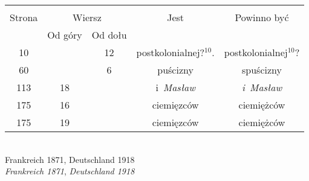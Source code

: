 \documentclass[a4paper,11pt]{article}
\begin{document}
\begin{center}

  \begin{tabular}{|c|c|c|c|c|}
    \hline
    & \multicolumn{2}{c|}{} & & \\
    Strona & \multicolumn{2}{c|}{Wiersz} & Jest
                              & Powinno być \\ \cline{2-3}
    & Od góry & Od dołu & & \\
    \hline
    10  & & 12 & postkolonialnej?$^{ 10 }$. & postkolonialnej$^{ 10 }$? \\
    60  & &  6 & puścizny & spuścizny \\
    113 & 18 & & i~\textit{Masław} & \textit{i~Masław} \\
    175 & 16 & & ciemięzców & ciemiężców \\
    175 & 19 & & ciemięzców & ciemiężców \\
    \hline
  \end{tabular}

\end{center}

\vspace{\spaceTwo}


\noindent
{} \\
\Jest  Frankreich 1871, Deutschland 1918 \\
\Powin \textit{Frankreich 1871}, \textit{Deutschland 1918} \\














\vspace{0em}


\end{document}
